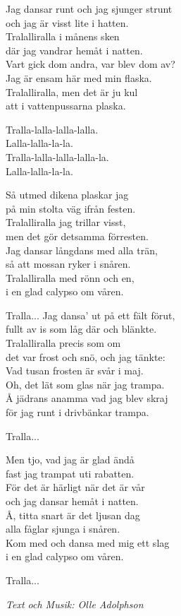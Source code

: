 \vspace{10pt}
Jag dansar runt och jag sjunger strunt\\
och jag är visst lite i hatten.\\
Tralalliralla i månens sken\\
där jag vandrar hemåt i natten.\\
Vart gick dom andra, var blev dom av?\\
Jag är ensam här med min flaska.\\
Tralalliralla, men det är ju kul\\
att i vattenpussarna plaska.\par
\vspace{10pt}
Tralla-lalla-lalla-lalla.\\
Lalla-lalla-la-la.\\
Tralla-lalla-lalla-lalla-la.\\
Lalla-lalla-la-la.\par
\vspace{10pt}
Så utmed dikena plaskar jag\\
på min stolta väg ifrån festen.\\
Tralalliralla jag trillar visst,\\
men det gör detsamma förresten.\\
Jag dansar långdans med alla trän,\\
så att mossan ryker i snåren.\\
Tralalliralla med rönn och en,\\
i en glad calypso om våren.\par
\vspace{10pt}
Tralla...
\newpage
Jag dansa' ut på ett fält förut,\\
fullt av is som låg där och blänkte.\\
Tralalliralla precis som om\\
det var frost och snö, och jag tänkte:\\
Vad tusan frosten är svår i maj.\\
Oh, det lät som glas när jag trampa.\\
Å jädrans anamma vad jag blev skraj\\
för jag runt i drivbänkar trampa.\par
\vspace{10pt}
Tralla...\par
\vspace{10pt}
Men tjo, vad jag är glad ändå\\
fast jag trampat uti rabatten.\\
För det är härligt när det är vår\\
och jag dansar hemåt i natten.\\
Å, titta snart är det ljusan dag\\
alla fåglar sjunga i snåren.\\
Kom med och dansa med mig ett slag\\
i en glad calypso om våren.\par
\vspace{10pt}
Tralla...\par
\vspace{10pt}
{\footnotesize\textit{Text och Musik: Olle Adolphson}}
